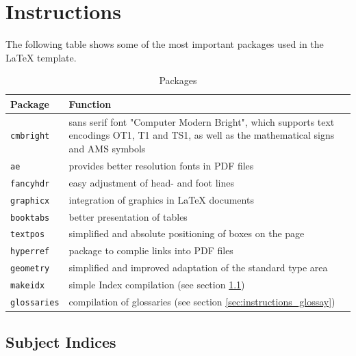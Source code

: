 \chapter{Instructions}
\label{chap:instructions}

The following table shows some of the most important packages used in the \LaTeX{} template.

\begin{table}[H]
	\centering
		\begin{tabular}{p{} p{}} \toprule
			\textbf{Package} & \textbf{Function} \\ \midrule
			\texttt{cmbright}\index{cmbright} & sans serif font "Computer Modern Bright", which supports text encodings\index{text encodings} OT1, T1 and TS1, as well as the mathematical signs and AMS symbols \\ \midrule
			\texttt{ae} & provides better resolution fonts in PDF files \\ \midrule
			\texttt{fancyhdr}\index{fancyhdr} & easy adjustment of head- and foot lines \\ \midrule
			\texttt{graphicx}\index{graphicx} & integration of graphics in \LaTeX{} documents \\ \midrule
			\texttt{booktabs}\index{booktabs} & better presentation of tables \\ \midrule
			\texttt{textpos}\index{textpos} & simplified and absolute positioning of boxes on the page \\ \midrule
			\texttt{hyperref}\index{hyperref} & package to complie links into PDF files \\ \midrule
			\texttt{geometry}\index{geometry} & simplified and improved adaptation of the standard type area \\ \midrule
			\texttt{makeidx}\index{makeidx} & simple Index compilation (see section \ref{sec:instructions_index}) \\ \midrule
			\texttt{glossaries}\index{glossaries} & compilation of glossaries (see section \ref{sec:instructions_glossay}) \\ \bottomrule
		\end{tabular}
	\caption{Packages}
	\label{tab:packages}
\end{table}


\section{Subject Indices}
\label{sec:instructions_index}


